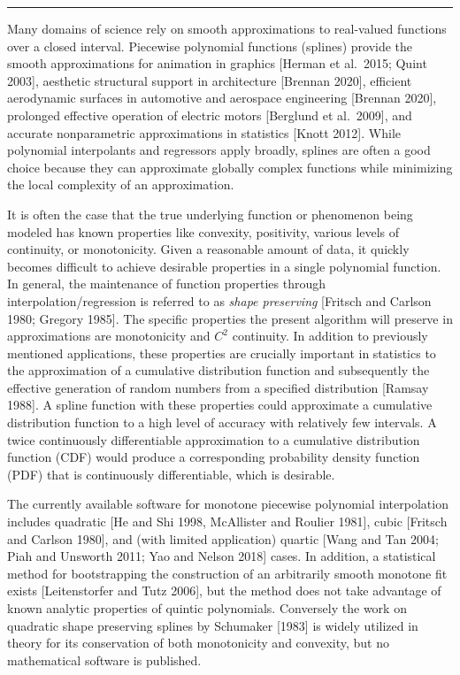 \bigskip\hrule\bigskip\medskip
{}

Many domains of science rely on smooth approximations to real-valued
functions over a closed interval. Piecewise polynomial functions
(splines) provide the smooth approximations for animation in graphics
[Herman et al.\ 2015; Quint 2003], aesthetic structural support in
architecture [Brennan 2020], efficient aerodynamic surfaces in
automotive and aerospace engineering [Brennan 2020], prolonged
effective operation of electric motors [Berglund et al.\ 2009], and
accurate nonparametric approximations in statistics [Knott
2012]. While polynomial interpolants and regressors apply broadly,
splines are often a good choice because they can approximate globally
complex functions while minimizing the local complexity of an
approximation.

It is often the case that the true underlying function or phenomenon
being modeled has known properties like convexity, positivity,
various levels of continuity, or monotonicity. Given a reasonable
amount of data, it quickly becomes difficult to achieve desirable
properties in a single polynomial function. In general, the
maintenance of function properties through interpolation/regression is
referred to as {\it shape preserving} [Fritsch and Carlson 1980;
Gregory 1985]. The specific properties the present algorithm will
preserve in approximations are monotonicity and $C^2$ continuity. In
addition to previously mentioned applications, these properties are
crucially important in statistics to the approximation of a cumulative
distribution function and subsequently the effective generation of
random numbers from a specified distribution [Ramsay 1988].  A spline
function with these properties could approximate a cumulative
distribution function to a high level of accuracy with relatively few
intervals. A twice continuously differentiable approximation to a
cumulative distribution function (CDF) would produce a corresponding
probability density function (PDF) that is continuously
differentiable, which is desirable.

The currently available software for monotone piecewise polynomial
interpolation includes quadratic [He and Shi 1998, McAllister and
Roulier 1981], cubic [Fritsch and Carlson 1980], and (with limited
application) quartic [Wang and Tan 2004; Piah and Unsworth 2011; Yao
and Nelson 2018] cases. In addition, a statistical method for
bootstrapping the construction of an arbitrarily smooth monotone fit
exists [Leitenstorfer and Tutz 2006], but the method does not take
advantage of known analytic properties of quintic polynomials.
Conversely the work on quadratic shape preserving splines by Schumaker
[1983] is widely utilized in theory for its conservation of both
monotonicity and convexity, but no mathematical software is published.

